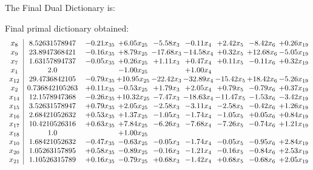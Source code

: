 \documentclass[8pt]{article}
\begin{document}
The Final Dual Dictionary is: 

 Final primal dictionary obtained: 
\[\begin{array}{c| c c@{\hskip 2pt} c@{\hskip 2pt} c@{\hskip 2pt} c@{\hskip 2pt} c@{\hskip 2pt} c@{\hskip 2pt} c@{\hskip 2pt} }
 x_{8}   &  8.52631578947 & -0.21 x_{35} & +  6.05 x_{25} & -5.58 x_{3} & -0.11 x_{4} & +  2.42 x_{5} & -8.42 x_{6} & +  0.26 x_{19}\\
 x_{9}   &  23.8947368421 & -0.16 x_{35} & +  8.79 x_{25} & -17.68 x_{3} & -14.58 x_{4} & +  0.32 x_{5} & + 12.68 x_{6} & -5.05 x_{19}\\
 x_{7}   &  1.63157894737 & -0.05 x_{35} & +  0.26 x_{25} & +  1.11 x_{3} & +  0.47 x_{4} & +  0.11 x_{5} & -0.11 x_{6} & +  0.32 x_{19}\\
 x_{1}   &  2.0  &   & -1.00 x_{25} &   & +  1.00 x_{4} &    &    &   \\
 x_{12}   &  29.4736842105 & -0.79 x_{35} & + 10.95 x_{25} & -22.42 x_{3} & -32.89 x_{4} & -15.42 x_{5} & + 18.42 x_{6} & -5.26 x_{19}\\
 x_{2}   &  0.736842105263 & +  0.11 x_{35} & -0.53 x_{25} & +  1.79 x_{3} & +  2.05 x_{4} & +  0.79 x_{5} & -0.79 x_{6} & +  0.37 x_{19}\\
 x_{14}   &  12.1578947368 & -0.26 x_{35} & + 10.32 x_{25} & -7.47 x_{3} & -18.63 x_{4} & -11.47 x_{5} & -1.53 x_{6} & -3.42 x_{19}\\
 x_{15}   &  3.52631578947 & +  0.79 x_{35} & +  2.05 x_{25} & -2.58 x_{3} & -3.11 x_{4} & -2.58 x_{5} & -0.42 x_{6} & +  1.26 x_{19}\\
 x_{16}   &  2.68421052632 & +  0.53 x_{35} & +  1.37 x_{25} & -1.05 x_{3} & -1.74 x_{4} & -1.05 x_{5} & +  0.05 x_{6} & +  0.84 x_{19}\\
 x_{17}   &  10.4210526316 & +  0.63 x_{35} & +  7.84 x_{25} & -6.26 x_{3} & -7.68 x_{4} & -7.26 x_{5} & -0.74 x_{6} & +  1.21 x_{19}\\
 x_{18}   &  1.0  &   & +  1.00 x_{25} &    &    &    &    &   \\
 x_{10}   &  1.68421052632 & -0.47 x_{35} & -0.63 x_{25} & -0.05 x_{3} & -1.74 x_{4} & -0.05 x_{5} & -0.95 x_{6} & +  2.84 x_{19}\\
 x_{20}   &  1.05263157895 & +  0.58 x_{35} & -0.89 x_{25} & -0.16 x_{3} & -1.21 x_{4} & -0.16 x_{5} & -0.84 x_{6} & +  2.53 x_{19}\\
 x_{21}   &  1.10526315789 & +  0.16 x_{35} & -0.79 x_{25} & +  0.68 x_{3} & -1.42 x_{4} & +  0.68 x_{5} & -0.68 x_{6} & +  2.05 x_{19}\\

\end{array}\]
\end{document}

